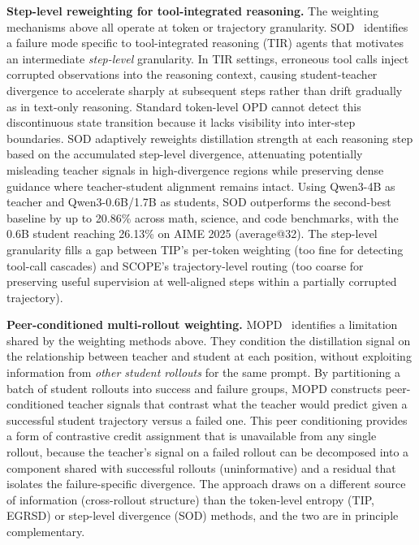 \documentclass{article} %
\begin{document}
\textbf{Step-level reweighting for tool-integrated reasoning.} The weighting mechanisms above all operate at token or trajectory granularity. SOD~\citep{2605.07725} identifies a failure mode specific to tool-integrated reasoning (TIR) agents that motivates an intermediate \emph{step-level} granularity. In TIR settings, erroneous tool calls inject corrupted observations into the reasoning context, causing student-teacher divergence to accelerate sharply at subsequent steps rather than drift gradually as in text-only reasoning. Standard token-level OPD cannot detect this discontinuous state transition because it lacks visibility into inter-step boundaries. SOD adaptively reweights distillation strength at each reasoning step based on the accumulated step-level divergence, attenuating potentially misleading teacher signals in high-divergence regions while preserving dense guidance where teacher-student alignment remains intact. Using Qwen3-4B as teacher and Qwen3-0.6B/1.7B as students, SOD outperforms the second-best baseline by up to 20.86\% across math, science, and code benchmarks, with the 0.6B student reaching 26.13\% on AIME 2025 (average@32). The step-level granularity fills a gap between TIP's per-token weighting (too fine for detecting tool-call cascades) and SCOPE's trajectory-level routing (too coarse for preserving useful supervision at well-aligned steps within a partially corrupted trajectory).

\textbf{Peer-conditioned multi-rollout weighting.} MOPD~\citep{2605.12652} identifies a limitation shared by the weighting methods above. They condition the distillation signal on the relationship between teacher and student at each position, without exploiting information from \emph{other student rollouts} for the same prompt. By partitioning a batch of student rollouts into success and failure groups, MOPD constructs peer-conditioned teacher signals that contrast what the teacher would predict given a successful student trajectory versus a failed one. This peer conditioning provides a form of contrastive credit assignment that is unavailable from any single rollout, because the teacher's signal on a failed rollout can be decomposed into a component shared with successful rollouts (uninformative) and a residual that isolates the failure-specific divergence. The approach draws on a different source of information (cross-rollout structure) than the token-level entropy (TIP, EGRSD) or step-level divergence (SOD) methods, and the two are in principle complementary.
\end{document}
